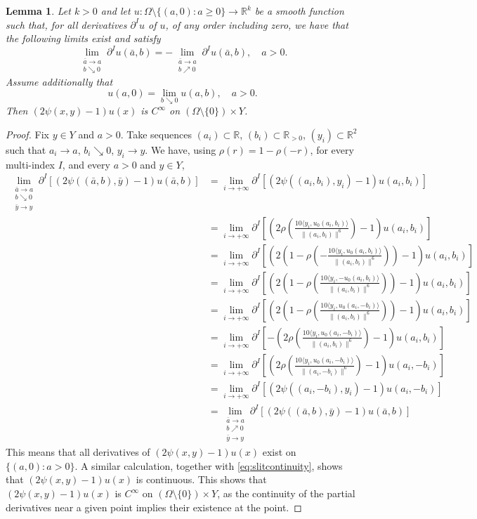 \documentclass{article}
\newcommand{\R}{\mathbb{R}}
\newtheorem{lemma}[theorem]{Lemma}
\theoremstyle{definition}
\theoremstyle{remark}
\newcommand{\uu}{u}
\begin{document}
\begin{lemma}\label{lem:lemregularity}
 Let $k>0$ and let $u\colon\Omega\setminus \{(a,0):a\geq 0\}\to\R^k$ be a smooth function such that, for all derivatives $\partial^Iu$ of $u$, of any order including zero, we have that the following limits exist and satisfy
 \[\lim_{\substack{\bar a\to a\\b\searrow0}}\partial^Iu(\bar a,b)=-\lim_{\substack{\bar a\to a\\b\nearrow0}}\partial^Iu(\bar a,b),\quad a> 0.\]
 Assume additionally that \begin{equation}\label{eq:slitcontinuity} 
 u(a,0)=\lim_{b\searrow0}u(a,b),\quad a>0.
 \end{equation}
%
 Then $(2\psi(x,y)-1)u(x)$ is $C^{\infty}$ on $(\Omega\setminus\{0\})\times Y$.
\end{lemma}
\begin{proof}
 Fix $y\in Y$ and $a>0$. Take sequences $(a_i)\subset\R$, $(b_i)\subset\R_{>0}$, $(y_i)\subset\R^2$ such that $a_i\to a$, $b_i\searrow0$, $y_i\to y$. We have, using $\rho(r)=1-\rho(-r)$, for every multi-index $I$, and every $a>0$ and $y\in Y$,
%
%
%
%
%
%
%
%
%
%
%
\begin{align*}
  \lim_{\substack{\bar a\to a\\ b\searrow 0\\\bar y\to y}}\partial^I[(2\psi((\bar a,b),\bar y)-1)u(\bar a,b)]
  &=\lim_{i\to+\infty}\partial^I[(2\psi((a_i,b_i),y_i)-1)u(a_i,b_i)]\\
  &=\lim_{i\to+\infty}\partial^I[(2\rho\left(\frac{10\langle y_i,\uu_0(a_i,b_i)\rangle}{\|(a_i,b_i)\|^6}\right)-1)u(a_i,b_i)]\\
  &=\lim_{i\to+\infty}\partial^I[(2(1-\rho\left(-\frac{10\langle y_i,\uu_0(a_i,b_i)\rangle}{\|(a_i,b_i)\|^6}\right))-1)u(a_i,b_i)] \\
  &=\lim_{i\to+\infty}
  \partial^I[(2(1-\rho\left(\frac{10\langle y_i,-\uu_0(a_i,b_i)\rangle}{\|(a_i,b_i)\|^6}\right))-1)u(a_i,b_i)] \\
    &=\lim_{i\to+\infty}\partial^I[(2(1-\rho\left(\frac{10\langle y_i,\uu_0(a_i,-b_i)\rangle}{\|(a_i,b_i)\|^6}\right))-1)u(a_i,b_i)] \\
  &=\lim_{i\to+\infty}\partial^I[-(2\rho\left(\frac{10\langle y_i,\uu_0(a_i,-b_i)\rangle}{\|(a_i,b_i)\|^6}\right)-1)u(a_i,b_i)] \\
   &=\lim_{i\to+\infty}\partial^I[(2\rho\left(\frac{10\langle y_i,\uu_0(a_i,-b_i)\rangle}{\|(a_i,-b_i)\|^6}\right)-1)u(a_i,-b_i)] \\
    &=\lim_{i\to+\infty}\partial^I[(2\psi((a_i,-b_i),y_i)-1)u(a_i,-b_i)]\\
    &=\lim_{\substack{\bar a\to a\\ b\nearrow 0\\\bar y\to y}}\partial^I[(2\psi((\bar a,b),\bar y)-1)u(\bar a,b)]
  \end{align*} 
  This means that all derivatives of $(2\psi(x,y)-1)u(x)$ exist on $\{(a,0):a> 0\}$. 
  A similar calculation, together with \eqref{eq:slitcontinuity}, shows that $(2\psi(x,y)-1)u(x)$ is continuous. This shows that $(2\psi(x,y)-1)u(x)$ is $C^\infty$ on $(\Omega\setminus\{0\})\times Y$, as the continuity of the partial derivatives near a given point implies their existence at the point.
\end{proof}
\end{document}
